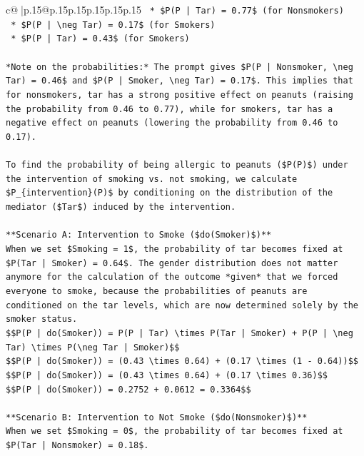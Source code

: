 \documentclass{article}
\begin{document}
{\begin{supertabular}{c@{$\;$}|p{.15\linewidth}@{}p{.15\linewidth}p{.15\linewidth}p{.15\linewidth}p{.15\linewidth}p{.15\linewidth}}
{{{\texttt{    *   \$P(P | Tar) = 0.77\$ (for Nonsmokers)} \\
\texttt{    *   \$P(P | \textbackslash{}neg Tar) = 0.17\$ (for Smokers)} \\
\texttt{    *   \$P(P | Tar) = 0.43\$ (for Smokers)} \\
\\ 
\texttt{*Note on the probabilities:* The prompt gives \$P(P | Nonsmoker, \textbackslash{}neg Tar) = 0.46\$ and \$P(P | Smoker, \textbackslash{}neg Tar) = 0.17\$. This implies that for nonsmokers, tar has a strong positive effect on peanuts (raising the probability from 0.46 to 0.77), while for smokers, tar has a negative effect on peanuts (lowering the probability from 0.46 to 0.17).} \\
\\ 
\texttt{To find the probability of being allergic to peanuts (\$P(P)\$) under the intervention of smoking vs. not smoking, we calculate \$P\_\{intervention\}(P)\$ by conditioning on the distribution of the mediator (\$Tar\$) induced by the intervention.} \\
\\ 
\texttt{**Scenario A: Intervention to Smoke (\$do(Smoker)\$)**} \\
\texttt{When we set \$Smoking = 1\$, the probability of tar becomes fixed at \$P(Tar | Smoker) = 0.64\$. The gender distribution does not matter anymore for the calculation of the outcome *given* that we forced everyone to smoke, because the probabilities of peanuts are conditioned on the tar levels, which are now determined solely by the smoker status.} \\
\texttt{\$\$P(P | do(Smoker)) = P(P | Tar) \textbackslash{}times P(Tar | Smoker) + P(P | \textbackslash{}neg Tar) \textbackslash{}times P(\textbackslash{}neg Tar | Smoker)\$\$} \\
\texttt{\$\$P(P | do(Smoker)) = (0.43 \textbackslash{}times 0.64) + (0.17 \textbackslash{}times (1 {-} 0.64))\$\$} \\
\texttt{\$\$P(P | do(Smoker)) = (0.43 \textbackslash{}times 0.64) + (0.17 \textbackslash{}times 0.36)\$\$} \\
\texttt{\$\$P(P | do(Smoker)) = 0.2752 + 0.0612 = 0.3364\$\$} \\
\\ 
\texttt{**Scenario B: Intervention to Not Smoke (\$do(Nonsmoker)\$)**} \\
\texttt{When we set \$Smoking = 0\$, the probability of tar becomes fixed at \$P(Tar | Nonsmoker) = 0.18\$.} \\
}}}
\end{supertabular}}
\end{document}
